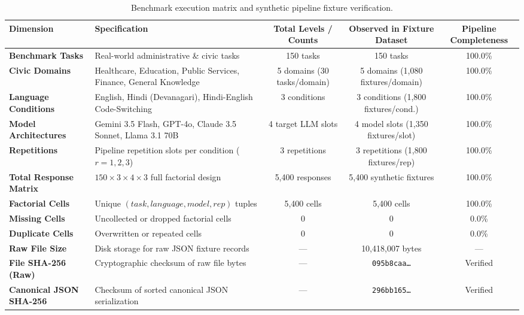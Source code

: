 \documentclass[11pt,a4paper]{article}
\begin{document}
\begin{table}[htbp]
\centering
\small
\begin{tabularx}{\textwidth}{l X c c c}
\toprule
\textbf{Dimension} & \textbf{Specification} & \textbf{Total Levels / Counts} & \textbf{Observed in Fixture Dataset} & \textbf{Pipeline Completeness} \\
\midrule
\textbf{Benchmark Tasks} & Real-world administrative \& civic tasks & 150 tasks & 150 tasks & 100.0\% \\
\textbf{Civic Domains} & Healthcare, Education, Public Services, Finance, General Knowledge & 5 domains (30 tasks/domain) & 5 domains (1,080 fixtures/domain) & 100.0\% \\
\textbf{Language Conditions} & English, Hindi (Devanagari), Hindi-English Code-Switching & 3 conditions & 3 conditions (1,800 fixtures/cond.) & 100.0\% \\
\textbf{Model Architectures} & Gemini 3.5 Flash, GPT-4o, Claude 3.5 Sonnet, Llama 3.1 70B & 4 target LLM slots & 4 model slots (1,350 fixtures/slot) & 100.0\% \\
\textbf{Repetitions} & Pipeline repetition slots per condition ($r=1, 2, 3$) & 3 repetitions & 3 repetitions (1,800 fixtures/rep) & 100.0\% \\
\midrule
\textbf{Total Response Matrix} & $150 \times 3 \times 4 \times 3$ full factorial design & 5,400 responses & 5,400 synthetic fixtures & 100.0\% \\
\textbf{Factorial Cells} & Unique $(task, language, model, rep)$ tuples & 5,400 cells & 5,400 cells & 100.0\% \\
\textbf{Missing Cells} & Uncollected or dropped factorial cells & 0 & 0 & 0.0\% \\
\textbf{Duplicate Cells} & Overwritten or repeated cells & 0 & 0 & 0.0\% \\
\midrule
\textbf{Raw File Size} & Disk storage for raw JSON fixture records & --- & 10,418,007 bytes & --- \\
\textbf{File SHA-256 (Raw)} & Cryptographic checksum of raw file bytes & --- & \texttt{095b8caa\dots} & Verified \\
\textbf{Canonical JSON SHA-256} & Checksum of sorted canonical JSON serialization & --- & \texttt{296bb165\dots} & Verified \\
\bottomrule
\end{tabularx}
\caption{Benchmark execution matrix and synthetic pipeline fixture verification.}
\label{tab:execution_matrix}
\end{table}
\end{document}
